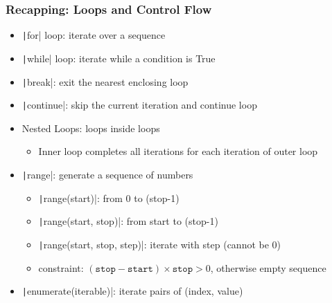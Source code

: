 \documentclass{beamer}
\newcommand{\python}[1]{\texttt|#1|}
\begin{document}
\begin{frame}[fragile]
    \frametitle{Recapping: Loops and Control Flow}
    \begin{itemize}
        \item \python{for} loop: iterate over a sequence
        \item \python{while} loop: iterate while a condition is True
        \item \python{break}: exit the nearest enclosing loop
        \item \python{continue}: skip the current iteration and continue loop
        \item Nested Loops: loops inside loops
              \begin{itemize}
                  \item Inner loop completes all iterations for each iteration of outer loop
              \end{itemize}
        \item \python{range}: generate a sequence of numbers
              \begin{itemize}
                  \item \python{range(start)}: from 0 to (stop-1)
                  \item \python{range(start, stop)}: from start to (stop-1)
                  \item \python{range(start, stop, step)}: iterate with step (cannot be 0)
                  \item constraint: $(\texttt{stop} - \texttt{start}) \times \texttt{stop} > 0$, otherwise empty sequence
              \end{itemize}
        \item \python{enumerate(iterable)}: iterate pairs of (index, value)
    \end{itemize}
\end{frame}
\end{document}

